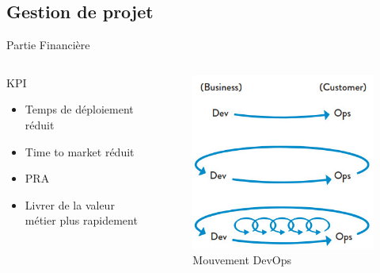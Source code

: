 \subsection{Gestion de projet}
\begin{frame}{Partie Financière}
	\begin{columns}[onlytextwidth]
		\begin{block}{KPI}
			\begin{itemize}
				\item Temps de déploiement réduit
				\item Time to market réduit
				\item PRA
				\item Livrer de la valeur métier plus rapidement
			\end{itemize}
		\end{block}
		\pause
		\begin{figure}
			\includegraphics[width=0.9\linewidth]{../img/devops-objective.jpg}
			\caption{Mouvement DevOps}
			\label{fig:devops}
		\end{figure}
	\end{columns}
\end{frame}

